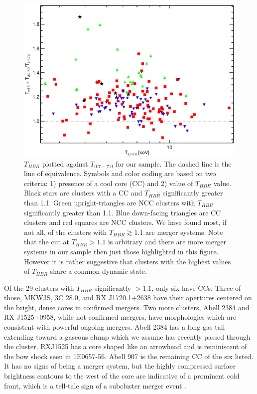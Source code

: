 \documentclass[12pt,preprint]{aastex}
\begin{document}
\begin{figure}
\begin{center}
\includegraphics*[width=\textwidth, trim=5mm 0mm 0mm 0mm, clip]{f6.eps}
\caption{
$T_{HBR}$ plotted against $T_{0.7-7.0}$ for our sample. The dashed line
is the line of equivalence. Symbols and color coding are based on two
criteria: 1) presence of a cool core
(CC) and 2) value of $T_{HBR}$ value. Black stars are clusters with a
CC and $T_{HBR}$ significantly greater than 1.1. Green
upright-triangles are NCC clusters with $T_{HBR}$ significantly
greater than 1.1. Blue down-facing triangles are CC clusters and red
squares are NCC clusters. We have found most, if not all, of the
clusters with $T_{HBR} \gtrsim 1.1$ are merger systems. Note that the
cut at $T_{HBR} > 1.1$ is arbitrary and there are more merger systems
in our sample then just those highlighted in this figure. However it
is rather suggestive that clusters with the highest values of $T_{HBR}$
share a common dynamic state.
}
\label{fig:ftx_tx}
\end{center}
\end{figure}

Of the 29 clusters with $T_{HBR}$ significantly $> 1.1$, only six have
CCs. Three of those, MKW3S, 3C 28.0, and RX J1720.1+2638 have their
apertures centered on the bright, dense cores in confirmed
mergers. Two more clusters, Abell 2384 and RX J1525+0958, while
not confirmed mergers, have morphologies which are consistent with
powerful ongoing mergers. Abell 2384 has a long gas tail extending toward
a gaseous clump which we assume has recently passed through the cluster.
RXJ1525 has a core shaped like an arrowhead and is reminiscent of the
bow shock seen in 1E0657-56. Abell 907 is the remaining CC of the six
listed. It has no signs of being a merger system, but the highly
compressed surface brightness contours to the west of the core are
indicative of a prominent cold front, which is a tell-tale sign of a
subcluster merger event \citep{2007PhR...443....1M}.
\end{document}
